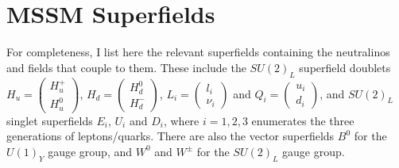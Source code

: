 \documentclass[english, notitlepage]{article}
\begin{document}
\section{MSSM Superfields}
    For completeness, I list here the relevant superfields containing the neutralinos and fields that couple to them.
    These include the $SU(2)_L$ superfield doublets $H_u = \begin{pmatrix} H_u^+ \\ H_u^0 \end{pmatrix}$, $H_d = \begin{pmatrix} H_d^0 \\ H_d^- \end{pmatrix}$, $L_i = \begin{pmatrix} l_i \\ \nu_i \end{pmatrix}$ and $Q_i = \begin{pmatrix} u_i \\ d_i \end{pmatrix}$, and $SU(2)_L$ singlet superfields $E_i$, $U_i$ and $D_i$, where \(i=1,2,3\) enumerates the three generations of leptons/quarks.
    There are also the vector superfields $B^0$ for the $U(1)_Y$ gauge group, and $W^0$ and $W^\pm$ for the $SU(2)_L$ gauge group.
\end{document}

